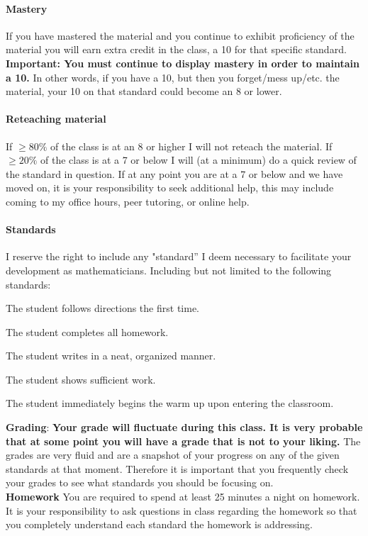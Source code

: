 \documentclass[12pt]{article}
\begin{document}
\paragraph*{Mastery}
If you have mastered the material and you continue to exhibit proficiency of the material you will earn extra credit in the class, a 10 for that specific standard. \textbf{Important: You must continue to display mastery in order to maintain a 10.}  In other words, if you have a 10, but then you forget/mess up/etc. the material, your 10 on that standard could become an 8 or lower.

\paragraph*{Reteaching material}
If $ \geq 80\%$ of the class is at an 8 or higher I will not reteach the material.  If $\geq 20\%$ of the class is at a 7 or below I will (at a minimum) do a quick review of the standard in question.  If at any point you are at a 7 or below and we have moved on, it is your responsibility to seek additional help, this may include coming to my office hours, peer tutoring, or online help.

\paragraph*{Standards}
I reserve the right to include any "standard'' I deem necessary to facilitate your development as mathematicians.  Including but not limited to the following standards:

The student follows directions the first time.

 The student completes all homework.

 The student writes in a neat, organized manner.

 The student shows sufficient work.

 The student immediately begins the warm up upon entering the classroom.


\noindent\textbf{Grading}: \textbf{Your grade will fluctuate during this class.  It is very probable that at some point you will have a grade that is not to your liking.}  The grades are very fluid and are a snapshot of your progress on any of the given standards at that moment.  Therefore it is important that you frequently check your grades to see what standards you should be focusing on.\\

\textbf{Homework}  You are required to spend at least 25 minutes a night on homework.  It is your responsibility to ask questions in class regarding the homework so that you completely understand each standard the homework is addressing.
\end{document}
